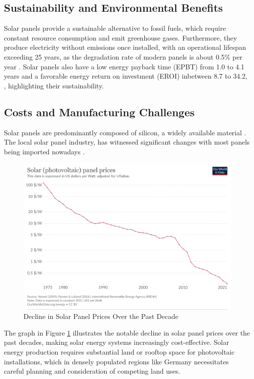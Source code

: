 \documentclass[12pt]{report}
\begin{document}
\subsection*{Sustainability and Environmental Benefits}
Solar panels provide a sustainable alternative to fossil fuels, which require constant resource consumption and emit greenhouse gases. 
Furthermore, they produce electricity without emissions once installed, with an operational lifespan exceeding 25 years, as the degradation rate of modern panels is about 0.5\% per year \cite{DirkJordanandSarahKurtz:NREL.}.
Solar panels also have a low energy payback time (EPBT) from 1.0 to 4.1 years \cite{FraunhoferInstituteforSolarEnergySystemsISE.21.02.2023}
and a favorable energy return on investment (EROI) inbetween 8.7 to 34.2, \cite{Bhandari.2015}, highlighting their sustainability.

\subsection*{Costs and Manufacturing Challenges}
Solar panels are predominantly composed of silicon, a widely available material \cite{Nachnamenichtvorhanden.11.08.2023}.
The local solar panel industry, has witnessed significant changes with most panels being imported nowadays \cite{StatistischesBundesamt.01.03.2023}. 

\begin{figure}[H]
    \centering
    \includegraphics[width=0.7\linewidth]{images/solar-pv-prices.png}
    \caption{Decline in Solar Panel Prices Over the Past Decade \cite{irena}}
    \label{fig:solar_panel_prices}
\end{figure}
\noindent The graph in Figure \ref{fig:solar_panel_prices} illustrates the notable decline in solar panel prices over the past decades, making solar energy systems increasingly
cost-effective.
Solar energy production requires substantial land or rooftop space for photovoltaic installations, which in densely populated regions
like Germany necessitates careful planning and consideration of competing land uses.
\end{document}
